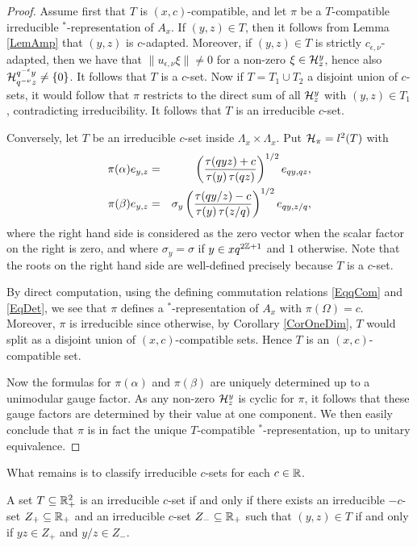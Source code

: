 \begin{proof} Assume first that $T$ is $(x,c)$-compatible, and let $\pi$ be a $T$-compatible irreducible $^*$-representation of $A_x$. If $(y,z)\in T$, then it follows from Lemma \ref{LemAmp} that $(y,z)$ is $c$-adapted. Moreover, if $(y,z)\in T$ is strictly $c_{\epsilon,\nu}$-adapted, then we have that $\|u_{\epsilon,\nu}\xi\|\neq 0$ for a non-zero $\xi\in \mathcal{H}^y_z$, hence also $\mathcal{H}^{q^{-\epsilon}y}_{q^{-\nu}z}\neq \{0\}$. It follows that $T$ is a $c$-set. Now if $T=T_1\cup T_2$ a disjoint union of $c$-sets, it would follow that $\pi$ restricts to the direct sum of all $\mathcal{H}^y_z$ with $(y,z)\in T_1$, contradicting irreducibility. It follows that $T$ is an irreducible $c$-set.

Conversely, let $T$ be an irreducible $c$-set inside $\Lambda_x\times \Lambda_x$. Put $\mathcal{H}_{\pi} = l^2(T)$ with \begin{eqnarray*} \pi(\alpha) e_{y,z} &=&  \left(\frac{\operatorname{\tau}(qyz)+c}{\operatorname{\tau}(y)\operatorname{\tau}(qz)}\right)^{1/2}e_{qy,qz},\\ \pi(\beta) e_{y,z} &=& \sigma_y\left(\frac{\operatorname{\tau}(qy/z)-c}{\operatorname{\tau}(y)\operatorname{\tau}(z/q)}\right)^{1/2} e_{qy,z/q},\end{eqnarray*} where the right hand side is considered as the zero vector when the scalar factor on the right is zero, and where $\sigma_y = \sigma$ if $y\in xq^{2\mathbb{Z}+1}$ and $1$ otherwise. Note that the roots on the right hand side are well-defined precisely because $T$ is a $c$-set. 

By direct computation, using the defining commutation relations \eqref{EqqCom} and \eqref{EqDet}, we see that $\pi$ defines a $^*$-representation of $A_x$ with $\pi(\Omega) =c$. Moreover, $\pi$ is irreducible since otherwise, by Corollary \ref{CorOneDim}, $T$ would split as a disjoint union of $(x,c)$-compatible sets. Hence $T$ is an $(x,c)$-compatible set.

Now the formulas for $\pi(\alpha)$ and $\pi(\beta)$ are uniquely determined up to a unimodular gauge factor. As any non-zero $\mathcal{H}^{y}_z$ is cyclic for $\pi$, it follows that these gauge factors are determined by their value at one component. We then easily conclude that $\pi$ is in fact the unique $T$-compatible $^*$-representation, up to unitary equivalence.
\end{proof}

What remains is to classify irreducible $c$-sets for each $c\in \mathbb{R}$. 

\begin{Lem}\label{LemClass2D} A set $T\subseteq \mathbb{R}_+^2$ is an irreducible $c$-set if and only if there exists an irreducible $-c$-set $Z_+\subseteq \mathbb{R}_+$ and an irreducible $c$-set $Z_-\subseteq \mathbb{R}_+$ such that $(y,z)\in T$ if and only if $yz\in Z_+$ and $y/z\in Z_-$.
\end{Lem} 

